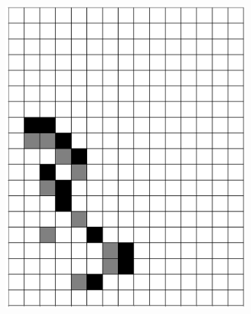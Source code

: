 \documentclass[12pt]{article}
\numberwithin{figure}{section} %
\begin{document}
\begin{figure}[H]
\begin{subfigure}{0.3\textwidth}
     		\includegraphics[width=\linewidth]{Section4/29.2}
     		\subcaption{}
   	\end{subfigure}
   

\end{figure}
\end{document}
